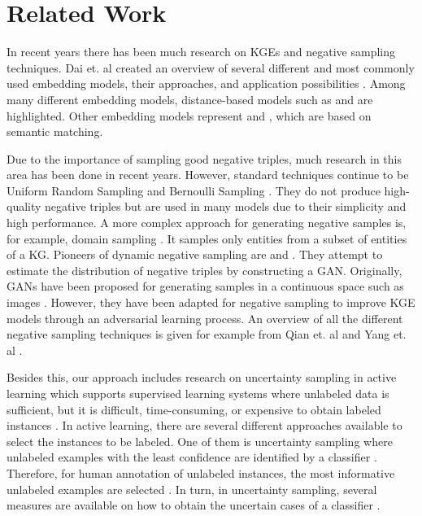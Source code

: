 \section{Related Work} 
\label{sec:relatedwork}
In recent years there has been much research on \acp{KGE} and negative sampling techniques.  
Dai et. al created an overview of several different and most commonly used embedding models, their approaches, and application possibilities \cite{electronics9050750}.
Among many different embedding models, distance-based models such as \transe \cite{TransE} and \transd \cite{TransD} are highlighted.
Other embedding models represent \distmult \cite{DistMult} and \complex \cite{ComplEx}, which are based on semantic matching. 

Due to the importance of sampling good negative triples, much research in this area has been done in recent years.
However, standard techniques continue to be Uniform Random Sampling \cite{TransE} and Bernoulli Sampling \cite{TransH}.
They do not produce high-quality negative triples but are used in many models due to their simplicity and high performance.  
A more complex approach for generating negative samples is, for example, domain sampling \cite{domainSampling}.
It samples only entities from a subset of entities of a \ac{KG}.
Pioneers of dynamic negative sampling are \kbgan \cite{cai2017kbgan} and \igan \cite{IGAN}.
They attempt to estimate the distribution of negative triples by constructing a \ac{GAN}.
Originally, \acp{GAN} have been proposed for generating samples in a continuous space such as images \cite{cai2017kbgan}.
However, they have been adapted for negative sampling to improve \ac{KGE} models through an adversarial learning process.
An overview of all the different negative sampling techniques is given for example from Qian et. al \cite{qiannegative} and Yang et. al \cite{MCNS}.

Besides this, our approach includes research on uncertainty sampling in active learning which supports supervised learning systems where unlabeled data is sufficient, but it is difficult, time-consuming, or expensive to obtain labeled instances \cite{Settles2009ActiveLL}.
In active learning, there are several different approaches available to select the instances to be labeled.
One of them is uncertainty sampling where unlabeled examples with the least confidence are identified by a classifier \cite{5272205}.
Therefore, for human annotation of unlabeled instances, the most informative unlabeled examples are selected \cite{5272205}.
In turn, in uncertainty sampling, several measures are available on how to obtain the uncertain cases of a classifier \cite{nguyen2021howtomeasure}.